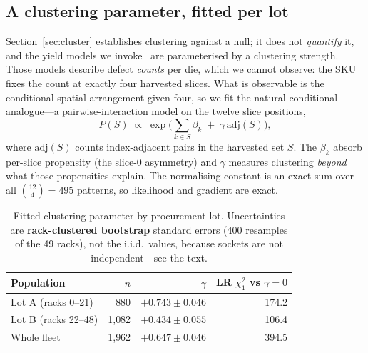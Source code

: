 \documentclass[10pt,conference]{IEEEtran}
\begin{document}
\subsection{A clustering parameter, fitted per lot}
\label{sec:yield}
Section~\ref{sec:cluster} establishes clustering against a null; it does not \emph{quantify} it,
and the yield models we invoke~\cite{koren1993negbinom,bae2007waferyield} are parameterised by a
clustering strength. Those models describe defect \emph{counts} per die, which we cannot observe:
the SKU fixes the count at exactly four harvested slices. What is observable is the conditional
spatial arrangement given four, so we fit the natural conditional analogue---a pairwise-interaction
model on the twelve slice positions,
\[
  P(S)\;\propto\;\exp\Big(\textstyle\sum_{k\in S}\beta_k \;+\; \gamma\,\mathrm{adj}(S)\Big),
\]
where $\mathrm{adj}(S)$ counts index-adjacent pairs in the harvested set $S$. The $\beta_k$ absorb
per-slice propensity (the slice-0 asymmetry) and $\gamma$ measures clustering \emph{beyond} what
those propensities explain. The normalising constant is an exact sum over all
$\binom{12}{4}=495$ patterns, so likelihood and gradient are exact.

\begin{table}[h]\centering\caption{Fitted clustering parameter by procurement lot. Uncertainties
are \textbf{rack-clustered bootstrap} standard errors (400 resamples of the 49 racks), not the
i.i.d.\ values, because sockets are not independent---see the text.}
\label{tab:yield}
\begin{tabular}{lrrr}\toprule
Population & $n$ & $\gamma$ & LR $\chi^2_1$ vs $\gamma{=}0$\\\midrule
Lot A (racks 0--21)  & 880 & $+0.743\pm0.046$ & 174.2\\
Lot B (racks 22--48) & 1{,}082 & $+0.434\pm0.055$ & 106.4\\
Whole fleet          & 1{,}962 & $+0.647\pm0.046$ & 394.5\\
\bottomrule\end{tabular}\end{table}
\end{document}
